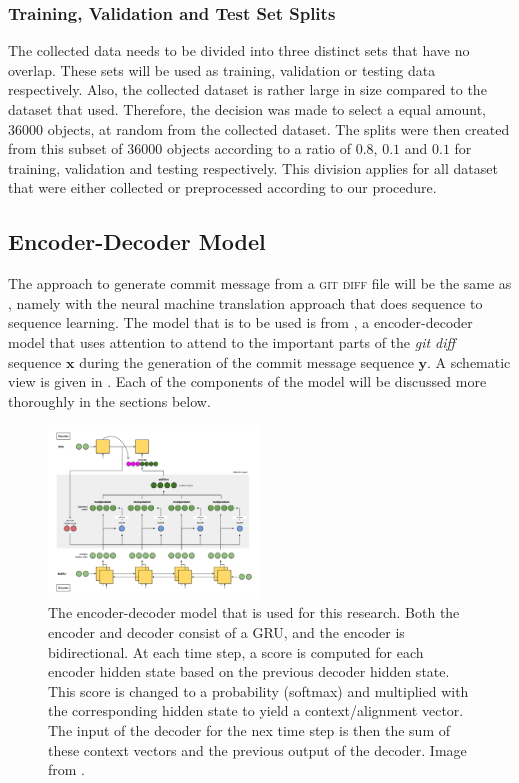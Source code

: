 \subsubsection{Training, Validation and Test Set Splits}
The collected data needs to be divided into three distinct sets that have no overlap. These sets will be used as training, validation or testing data respectively. Also, the collected dataset is rather large in size compared to the dataset that \citeauthor{jiang_automatically_2017} used. Therefore, the decision was made to select a equal amount, 36000 objects, at random from the collected dataset. The splits were then created from this subset of 36000 objects according to a ratio of $0.8$, $0.1$ and $0.1$ for training, validation and testing respectively. This division applies for all dataset that were either collected or preprocessed according to our procedure.

\subsection{Encoder-Decoder Model}\label{subsec:model}
The approach to generate commit message from a \textsc{git diff} file will be the same as \citeauthor{jiang_automatically_2017}, namely with the neural machine translation approach that does sequence to sequence learning. The model that is to be used is from \citeauthor{bahdanau2014neural}, a encoder-decoder model that uses attention to attend to the important parts of the \textit{git diff} sequence $\mathbf{x}$ during the generation of the commit message sequence $\mathbf{y}$. A schematic view is given in . Each of the components of the model will be discussed more thoroughly in the sections below.

\begin{figure}
    \centering
    \includegraphics[width=0.5\textwidth]{figs/network.png}
    \caption{The encoder-decoder model that is used for this research. Both the encoder and decoder consist of a GRU, and the encoder is bidirectional. At each time step, a score is computed for each encoder hidden state based on the previous decoder hidden state. This score is changed to a probability (softmax) and multiplied with the corresponding hidden state to yield a context/alignment vector. The input of the decoder for the nex time step is then the sum of these context vectors  and the previous output of the decoder. Image from \cite{network_pic}.}
    \label{fig:model}
\end{figure}

